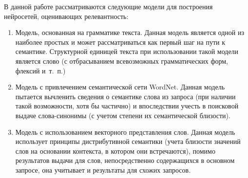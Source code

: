 В данной работе рассматриваются следующие модели для построения нейросетей, оценивающих релевантность:
\begin{enumerate}[1)]
    \item Модель, основанная на грамматике текста. Данная модель является одной из наиболее простых и может
    рассматриваться как первый шаг на пути к семантике. Структурной единицей текста при использовании такой модели
    является слово (с отбрасыванием всевозможных грамматических форм, флексий и~т.~п.)
    \item Модель с привлечением семантической сети WordNet. Данная модель пытается вычленить сведения о
    семантике слова из запроса (при наличии такой возможности, хотя бы частично) и впоследствии учесть
    в поисковой выдаче слова-синонимы (с учетом степени их семантической близости).
    \item Модель с использованием векторного представления слов. Данная модель использует принципы дистрибутивной
    семантики (учета близости значений слов на основании контекста, в котором они встречаются), помимо результатов
    выдачи для слов, непосредственно содержащихся в основном запросе, она учитывает и результаты для схожих
    запросов.
\end{enumerate}